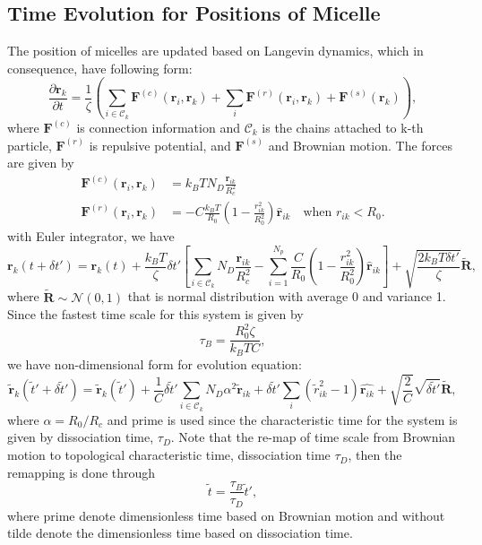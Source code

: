 \documentclass[10pt, a4paper]{article}
\begin{document}
\subsection{Time Evolution for Positions of Micelle}
The position of micelles are updated based on Langevin dynamics, which in consequence, have following form:
\begin{equation}
\frac{\partial \mathbf{r}_k}{\partial t} = \frac{1}{\zeta}\left(\sum_{i\in\mathscr{C}_k} \mathbf{F}^{(c)}(\mathbf{r}_i, \mathbf{r}_k) + \sum_i \mathbf{F}^{(r)}(\mathbf{r}_i, \mathbf{r}_k) + \mathbf{F}^{(s)}(\mathbf{r}_k)\right),
\end{equation}
where $\mathbf{F}^{(c)}$ is connection information and $\mathscr{C}_k$ is the chains attached to k-th particle, $\mathbf{F}^{(r)}$ is repulsive potential, and $\mathbf{F}^{(s)}$ and Brownian motion. The forces are given by
\begin{align}
\mathbf{F}^{(c)}(\mathbf{r}_i, \mathbf{r}_k) &= k_BTN_D\frac{\mathbf{r}_{ik}}{R_c^2} \\
\mathbf{F}^{(r)}(\mathbf{r}_i, \mathbf{r}_k) &= -C\frac{k_BT}{R_0}\left(1 - \frac{r_{ik}^2}{R_0^2}\right)\hat{\mathbf{r}}_{ik} \quad\textrm{when $r_{ik} < R_0$}.
\end{align}
with Euler integrator, we have
\begin{equation}
\mathbf{r}_k(t + \delta t') = \mathbf{r}_k(t) + \frac{k_BT}{\zeta}\delta t'\left[\sum_{i\in \mathscr{C}_k}N_D\frac{\mathbf{r}_{ik}}{R_c^2} - \sum_{i=1}^{N_p} \frac{C}{R_0}\left(1 - \frac{r_{ik}^2}{R_0^2}\right)\hat{\mathbf{r}}_{ik}\right] + \sqrt{\frac{2 k_BT \delta t'}{\zeta}}\tilde{\mathbf{R}},
\end{equation}
where $\tilde{\mathbf{R}}\sim \mathscr{N}(0, 1)$ that is normal distribution with average 0 and variance 1.
Since the fastest time scale for this system is given by
\begin{equation}
\tau_B = \frac{R_0^2\zeta}{k_BTC},
\end{equation}
we have non-dimensional form for evolution equation:
\begin{equation}
\tilde{\mathbf{r}}_k(\tilde{t}' + \delta \tilde{t}') = \tilde{\mathbf{r}}_k(\tilde{t}') + \frac{1}{C}\delta\tilde{t}'\sum_{i\in\mathscr{C}_k} N_D\alpha^2\tilde{\mathbf{r}}_{ik} + \delta\tilde{t}'  \sum_{i} (\tilde{r}_{ik}^2 - 1)\hat{\mathbf{r}_{ik}} + \sqrt{\frac{2}{C}}\sqrt{\delta \tilde{t}'}\tilde{\mathbf{R}},
\end{equation}
where $\alpha = R_0/R_c$ and prime is used since the characteristic time for the system is given by dissociation time, $\tau_D$. 
Note that the re-map of time scale from Brownian motion to topological characteristic time, dissociation time $\tau_D$, then the remapping is done through
\begin{equation}
\tilde{t} = \frac{\tau_B}{\tau_D}\tilde{t}',
\end{equation}
where prime denote dimensionless time based on Brownian motion and without tilde denote the dimensionless time based on dissociation time.
\end{document}
